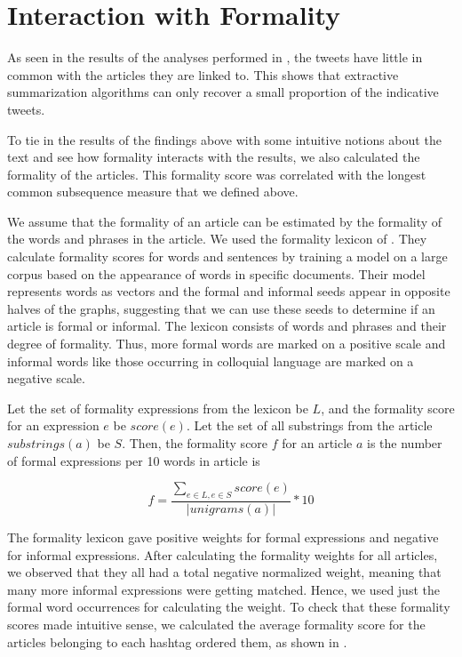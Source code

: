 \section{Interaction with Formality}

As seen in the results of the analyses performed in , the tweets have little in common with the articles they are linked to. This shows that extractive summarization algorithms can only recover a small proportion of the indicative tweets. 

To tie in the results of the findings above with some intuitive notions about the text and see how formality interacts with the results, we also calculated the formality of the articles. This formality score was correlated with the longest common subsequence measure that we defined above. 

We assume that the formality of an article can be estimated by the formality of the words and phrases in the article. We used the formality lexicon of . They calculate formality scores for words and sentences by training a model on a large corpus based on the appearance of words in specific documents. Their model represents words as vectors and the formal and informal seeds appear in opposite halves of the graphs, suggesting that we can use these seeds to determine if an article is formal or informal. The lexicon consists of words and phrases and their degree of formality. Thus, more formal words are marked on a positive scale and informal words like those occurring in colloquial language are marked on a negative scale. 

Let the set of formality expressions from the lexicon be $L$, and the formality score for an expression $e$ be $\textit{score}(e)$. Let the set of all substrings from the article $\textit{substrings}(a)$ be $S$. Then, the formality score $f$ for an article $a$ is the number of formal expressions per 10 words in article is   

\begin{equation}
f = \frac{\sum\limits_{e \in L, e \in S} \textit{score}(e)}{| unigrams(a) |} * 10
\end{equation}

The formality lexicon gave positive weights for formal expressions and negative for informal expressions. After calculating the formality weights for all articles, we observed that they all had a total negative normalized weight, meaning that many more informal expressions were getting matched. Hence, we used just the formal word occurrences for calculating the weight. To check that these formality scores made intuitive sense, we calculated the average formality score for the articles belonging to each hashtag ordered them, as shown in .


